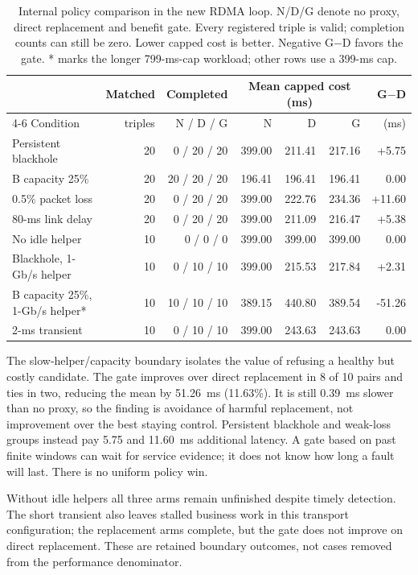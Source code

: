 \documentclass[sigconf]{acmart}
\begin{document}
\begin{table}[t]
\caption{Internal policy comparison in the new RDMA loop. N/D/G denote
no proxy, direct replacement and benefit gate. Every registered triple is
valid; completion counts can still be zero. Lower capped cost is better.
Negative G$-$D favors the gate. * marks the longer 799-ms-cap workload;
other rows use a 399-ms cap.}
\label{tab:rdma-policy}
\centering\small
\setlength{\tabcolsep}{5pt}
\begin{tabular}{@{}lrrrrrr@{}}
\toprule
& Matched & Completed & \multicolumn{3}{c}{Mean capped cost (ms)} & G$-$D\\
\cmidrule(lr){4-6}
Condition & triples & N / D / G & N & D & G & (ms)\\
\midrule
Persistent blackhole & 20 & 0 / 20 / 20 & 399.00 & 211.41 & 217.16 & +5.75\\
B capacity 25\% & 20 & 20 / 20 / 20 & 196.41 & 196.41 & 196.41 & 0.00\\
0.5\% packet loss & 20 & 0 / 20 / 20 & 399.00 & 222.76 & 234.36 & +11.60\\
80-ms link delay & 20 & 0 / 20 / 20 & 399.00 & 211.09 & 216.47 & +5.38\\
No idle helper & 10 & 0 / 0 / 0 & 399.00 & 399.00 & 399.00 & 0.00\\
Blackhole, 1-Gb/s helper & 10 & 0 / 10 / 10 & 399.00 & 215.53 & 217.84 & +2.31\\
B capacity 25\%, 1-Gb/s helper* & 10 & 10 / 10 / 10 & 389.15 & 440.80 & 389.54 & -51.26\\
2-ms transient & 10 & 0 / 10 / 10 & 399.00 & 243.63 & 243.63 & 0.00\\
\bottomrule
\end{tabular}
\end{table}

The slow-helper/capacity boundary isolates the value of refusing a healthy
but costly candidate. The gate improves over direct replacement in 8 of
10 pairs and ties in two, reducing the mean by 51.26~ms (11.63\%). It is
still 0.39~ms slower than no proxy, so the finding is avoidance of harmful
replacement, not improvement over the best staying control. Persistent
blackhole and weak-loss groups instead pay 5.75 and 11.60~ms additional
latency. A gate based on past finite windows can wait for service evidence;
it does not know how long a fault will last. There is no uniform policy win.

Without idle helpers all three arms remain unfinished despite timely
detection. The short transient also leaves stalled business work in this
transport configuration; the replacement arms complete, but the gate does
not improve on direct replacement. These are retained boundary outcomes,
not cases removed from the performance denominator.
\end{document}
